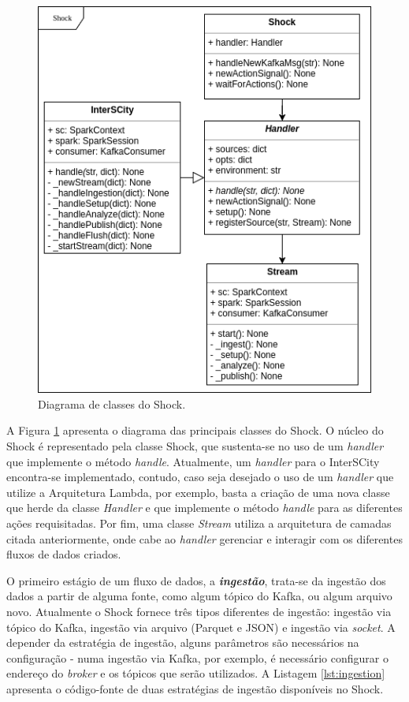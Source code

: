 \begin{figure}[hbt]
  \centering
    \includegraphics[scale=0.5]{figuras/ShockUML.png}
  \caption{Diagrama de classes do Shock.}
  \label{fig:uml}
\end{figure}

A Figura \ref{fig:uml} apresenta o diagrama das principais classes do Shock. O
núcleo do Shock é representado pela classe Shock, que sustenta-se no uso de um
\textit{handler} que implemente o método \textit{handle}. Atualmente, um
\textit{handler} para o InterSCity encontra-se implementado, contudo, caso
seja desejado o uso de um \textit{handler} que utilize a Arquitetura Lambda, por
exemplo, basta a criação de uma nova classe que herde da classe
\textit{Handler} e que implemente o método \textit{handle} para as diferentes
ações requisitadas. Por fim, uma classe \textit{Stream} utiliza a arquitetura
de camadas citada anteriormente, onde cabe ao \textit{handler} gerenciar e
interagir com os diferentes fluxos de dados criados.



O primeiro estágio de um fluxo de dados, a \textit{\textbf{ingestão}}, trata-se da
ingestão dos dados a partir de alguma fonte, como algum tópico do Kafka, ou
algum arquivo novo. Atualmente o Shock fornece três tipos diferentes de
ingestão: ingestão via tópico do Kafka, ingestão via arquivo (Parquet e JSON)
e ingestão via \textit{socket}. A depender da estratégia de ingestão, alguns
parâmetros são necessários na configuração - numa ingestão via Kafka, por
exemplo, é necessário configurar o endereço do \textit{broker} e os tópicos
que serão utilizados. A Listagem \ref{lst:ingestion} apresenta o código-fonte
de duas estratégias de ingestão disponíveis no Shock.

